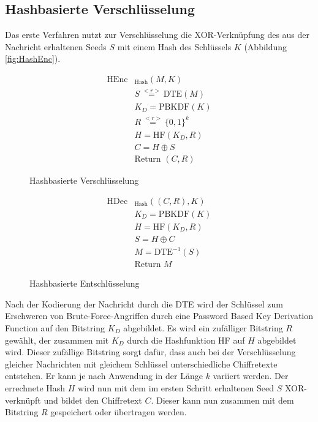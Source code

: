 \subsection{Hashbasierte Verschlüsselung}

Das erste Verfahren nutzt zur Verschlüsselung die XOR-Verknüpfung des aus der Nachricht erhaltenen Seeds \(S\) mit einem Hash des Schlüssels \(K\) (Abbildung \ref{fig:HashEnc}).  

\begin{figure}[h]
	\begin{minipage}[b]{0.5\textwidth}
		\begin{align*}
			\text{HEnc}&_{\text{Hash}}(M, K)\\
			&S \overset{<r>}{=} \text{DTE}(M)\\ 	%
			&K_D = \text{PBKDF}(K)\\ 		%
			&R \overset{<r>}{=} \{0,1\}^k\\	%
			&H = \text{HF}(K_D,R)\\	%
			&C = H \oplus S\\	%
			&\text{Return } (C,R)
		\end{align*}
		\caption{Hashbasierte Verschlüsselung}
		\label{fig:HashEnc}
	\end{minipage}
	\begin{minipage}[b]{0.5\textwidth}
		\begin{align*}
			\text{HDec}&_{\text{Hash}}((C,R), K)\\
			&K_D = \text{PBKDF}(K)\\ 		%
			&H = \text{HF}(K_D,R)\\	%
			&S = H \oplus C\\	%
			&M = \text{DTE}^{-1}(S)\\ 	%
			&\text{Return } M
		\end{align*}
		\caption{Hashbasierte Entschlüsselung}
		\label{fig:HashDec}
	\end{minipage}
\end{figure}

Nach der Kodierung der Nachricht durch die DTE wird der Schlüssel zum Erschweren von Brute-Force-Angriffen durch eine Password Based Key Derivation Function auf den Bitstring \(K_D\) abgebildet. Es wird ein zufälliger Bitstring \(R\) gewählt, der zusammen mit \(K_D\) durch die Hashfunktion HF auf \(H\) abgebildet wird. Dieser zufällige Bitstring sorgt dafür, dass auch bei der Verschlüsselung gleicher Nachrichten mit gleichem Schlüssel unterschiedliche Chiffretexte entstehen. Er kann je nach Anwendung in der Länge \(k\) variiert werden. Der errechnete Hash \(H\) wird nun mit dem im ersten Schritt erhaltenen Seed \(S\) XOR-verknüpft und bildet den Chiffretext \(C\). Dieser kann nun zusammen mit dem Bitstring \(R\) gespeichert oder übertragen werden. 

